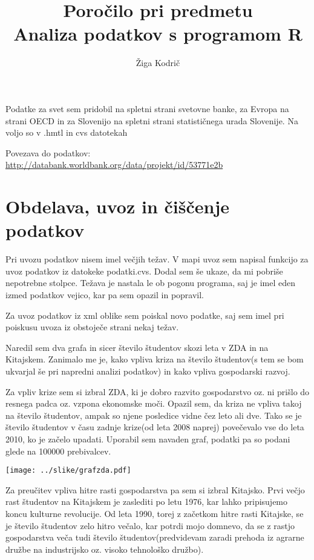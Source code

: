 \documentclass[11pt,a4paper]{article}
\begin{document}
\title{Poročilo pri predmetu \\
Analiza podatkov s programom R}
\author{Žiga Kodrič}

Podatke za svet sem pridobil na spletni strani svetovne banke, za Evropa na strani OECD in za Slovenijo na spletni strani statističnega urada Slovenije. Na voljo so v .hmtl in cvs datotekah

Povezava do podatkov: \url{http://databank.worldbank.org/data/projekt/id/53771e2b}
\section{Obdelava, uvoz in čiščenje podatkov}
Pri uvozu podatkov nisem imel večjih težav. V mapi uvoz sem napisal funkcijo za uvoz podatkov iz datokeke podatki.cvs. Dodal sem še ukaze, da mi pobriše nepotrebne stolpce. Težava je nastala le ob pogonu programa, saj je imel eden izmed podatkov vejico, kar pa sem opazil in popravil. 

Za uvoz podatkov iz xml oblike sem poiskal novo podatke, saj sem imel pri poiskusu uvoza iz obstoječe strani nekaj težav. 

Naredil sem dva grafa in sicer število študentov skozi leta v ZDA in na Kitajskem. Zanimalo me je, kako vpliva kriza na število študentov(s tem se bom ukvarjal še pri napredni analizi podatkov) in kako vpliva gospodarski razvoj.

Za vpliv krize sem si izbral ZDA, ki je dobro razvito gospodarstvo oz. ni prišlo do resnega padca oz. vzpona ekonomske moči. Opazil sem, da kriza ne vpliva takoj na število študentov, ampak so njene posledice vidne čez leto ali dve. Tako se je število študentov v času zadnje krize(od leta 2008 naprej) povečevalo vse do leta 2010, ko je začelo upadati. Uporabil sem navaden graf, podatki pa so podani glede na 100000 prebivalcev. 

\texttt{[image: ../slike/grafzda.pdf]}

Za preučitev vpliva hitre rasti gospodarstva pa sem si izbral Kitajsko. Prvi večjo rast študentov na Kitajskem je zaslediti po letu 1976, kar lahko pripisujemo koncu kulturne revolucije. Od leta 1990, torej z začetkom hitre rasti Kitajske, se je število študentov zelo hitro večalo, kar potrdi mojo domnevo, da se z rastjo gospodarstva veča tudi število študentov(predvidevam zaradi prehoda iz agrarne družbe na industrijsko oz. visoko tehnološko družbo). 
\end{document}
